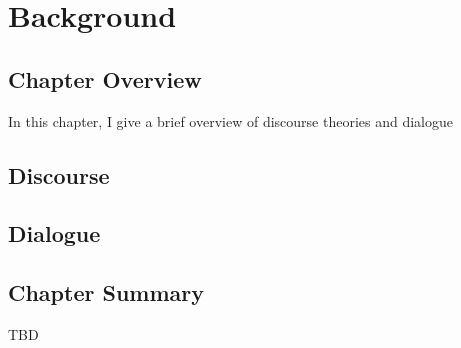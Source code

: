 \chapter{Background}
\label{ch:background}

\section{Chapter Overview}

In this chapter, I give a brief overview of discourse theories and dialogue

\section{Discourse}

\section{Dialogue}

\section{Chapter Summary}

TBD